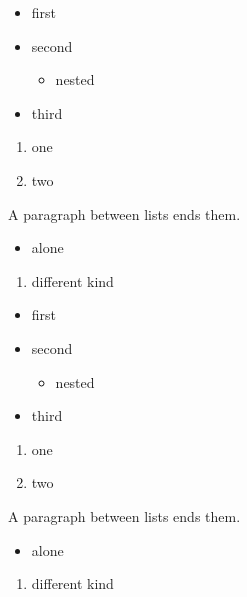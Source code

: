 \begin{frame}[t]
\begin{itemize}
\item first
\item second

\begin{itemize}
\item nested
\end{itemize}
\item third
\end{itemize}

\begin{enumerate}
\item one
\item two
\end{enumerate}

A paragraph between lists ends them.

\begin{itemize}
\item alone
\end{itemize}

\begin{enumerate}
\item different kind
\end{enumerate}
\end{frame}

\begin{frame}[t]
\begin{itemize}
\item first
\item second

\begin{itemize}
\item nested
\end{itemize}
\item third
\end{itemize}

\begin{enumerate}
\item one
\item two
\end{enumerate}

A paragraph between lists ends them.

\begin{itemize}
\item alone
\end{itemize}

\begin{enumerate}
\item different kind
\end{enumerate}
\end{frame}

